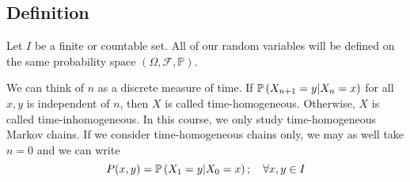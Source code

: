 \subsection{Definition}
Let \( I \) be a finite or countable set.
All of our random variables will be defined on the same probability space \( (\Omega, \mathcal F, \mathbb P) \).
We can think of \( n \) as a discrete measure of time.
If \( \mathbb{P}\left({X_{n+1} = y | X_n = x}\right) \) for all \( x, y \) is independent of \( n \), then \( X \) is called time-homogeneous.
Otherwise, \( X \) is called time-inhomogeneous.
In this course, we only study time-homogeneous Markov chains.
If we consider time-homogeneous chains only, we may as well take \( n = 0 \) and we can write
\[ P(x,y) = \mathbb{P}\left({X_1 = y | X_0 = x}\right);\quad \forall x,y \in I \]
